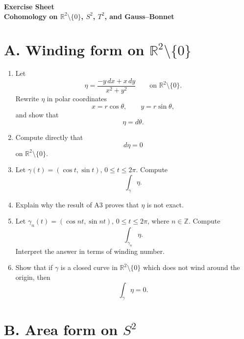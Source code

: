 \documentclass[11pt]{article}
\begin{document}
	
	\begin{center}
		{\Large \textbf{Exercise Sheet}}\\[4pt]
		{\large \textbf{Cohomology on \(\mathbb{R}^2\setminus\{0\}\), \(S^2\), \(T^2\), and Gauss--Bonnet}}
	\end{center}
	
	\vspace{0.8em}
	
	\section*{A. Winding form on \(\mathbb{R}^2\setminus\{0\}\)}
	
	\begin{enumerate}[leftmargin=2em,label=\textbf{A\arabic*.}]
		\item Let
		\[
		\eta=\frac{-y\,dx+x\,dy}{x^2+y^2}
		\qquad\text{on }\mathbb{R}^2\setminus\{0\}.
		\]
		Rewrite \(\eta\) in polar coordinates
		\[
		x=r\cos\theta,\qquad y=r\sin\theta,
		\]
		and show that
		\[
		\eta=d\theta.
		\]
		
		\item Compute directly that
		\[
		d\eta=0
		\]
		on \(\mathbb{R}^2\setminus\{0\}\).
		
		\item Let \(\gamma(t)=(\cos t,\sin t)\), \(0\le t\le 2\pi\). Compute
		\[
		\int_\gamma \eta.
		\]
		
		\item Explain why the result of A3 proves that \(\eta\) is not exact.
		
		\item Let \(\gamma_n(t)=(\cos nt,\sin nt)\), \(0\le t\le 2\pi\), where \(n\in\mathbb{Z}\). Compute
		\[
		\int_{\gamma_n}\eta.
		\]
		Interpret the answer in terms of winding number.
		
		\item Show that if \(\gamma\) is a closed curve in \(\mathbb{R}^2\setminus\{0\}\) which does not wind around the origin, then
		\[
		\int_\gamma \eta=0.
		\]
	\end{enumerate}
	
	\section*{B. Area form on \(S^2\)}
	
\end{document}
